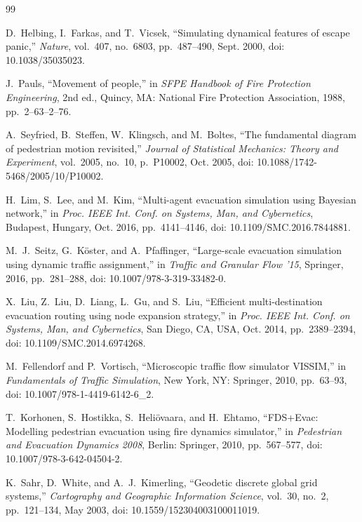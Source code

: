 \documentclass[12pt,a4paper,oneside]{report}
\begin{document}
\begin{thebibliography}{99}

D.~Helbing, I.~Farkas, and T.~Vicsek, ``Simulating dynamical features of escape panic,'' \emph{Nature}, vol.~407, no.~6803, pp.~487--490, Sept. 2000, doi: 10.1038/35035023.

J.~Pauls, ``Movement of people,'' in \emph{SFPE Handbook of Fire Protection Engineering}, 2nd ed., Quincy, MA: National Fire Protection Association, 1988, pp.~2--63--2--76.

A.~Seyfried, B.~Steffen, W.~Klingsch, and M.~Boltes, ``The fundamental diagram of pedestrian motion revisited,'' \emph{Journal of Statistical Mechanics: Theory and Experiment}, vol.~2005, no.~10, p.~P10002, Oct. 2005, doi: 10.1088/1742-5468/2005/10/P10002.

H.~Lim, S.~Lee, and M.~Kim, ``Multi-agent evacuation simulation using Bayesian network,'' in \emph{Proc. IEEE Int. Conf. on Systems, Man, and Cybernetics}, Budapest, Hungary, Oct. 2016, pp.~4141--4146, doi: 10.1109/SMC.2016.7844881.

M.~J.~Seitz, G.~K\"{o}ster, and A.~Pfaffinger, ``Large-scale evacuation simulation using dynamic traffic assignment,'' in \emph{Traffic and Granular Flow '15}, Springer, 2016, pp.~281--288, doi: 10.1007/978-3-319-33482-0.

X.~Liu, Z.~Liu, D.~Liang, L.~Gu, and S.~Liu, ``Efficient multi-destination evacuation routing using node expansion strategy,'' in \emph{Proc. IEEE Int. Conf. on Systems, Man, and Cybernetics}, San Diego, CA, USA, Oct. 2014, pp.~2389--2394, doi: 10.1109/SMC.2014.6974268.

M.~Fellendorf and P.~Vortisch, ``Microscopic traffic flow simulator VISSIM,'' in \emph{Fundamentals of Traffic Simulation}, New York, NY: Springer, 2010, pp.~63--93, doi: 10.1007/978-1-4419-6142-6\_2.

T.~Korhonen, S.~Hostikka, S.~Heliövaara, and H.~Ehtamo, ``FDS+Evac: Modelling pedestrian evacuation using fire dynamics simulator,'' in \emph{Pedestrian and Evacuation Dynamics 2008}, Berlin: Springer, 2010, pp.~567--577, doi: 10.1007/978-3-642-04504-2.

K.~Sahr, D.~White, and A.~J.~Kimerling, ``Geodetic discrete global grid systems,'' \emph{Cartography and Geographic Information Science}, vol.~30, no.~2, pp.~121--134, May 2003, doi: 10.1559/152304003100011019.


\end{thebibliography}
\end{document}
